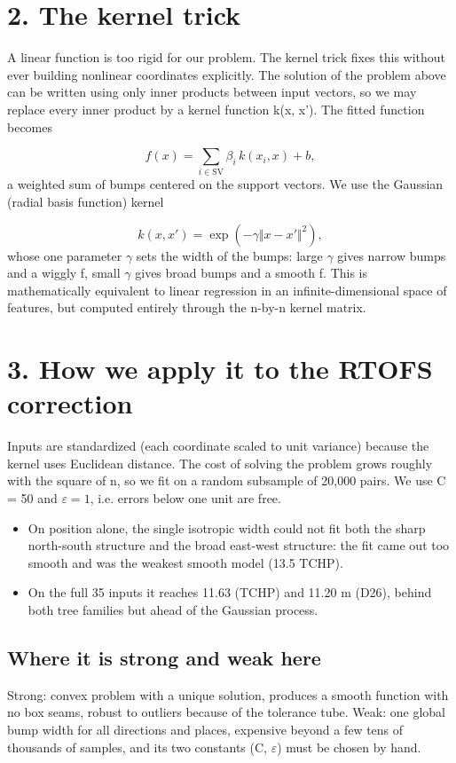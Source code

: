 \documentclass[11pt]{article}
\begin{document}
\section*{2. The kernel trick}
A linear function is too rigid for our problem. The kernel trick fixes this without ever building nonlinear coordinates explicitly. The solution of the problem above can be written using only inner products between input vectors, so we may replace every inner product by a kernel function k(x, x'). The fitted function becomes

\[ f(x) = \sum_{i \in \mathrm{SV}} \beta_i\, k(x_i, x) + b, \]
a weighted sum of bumps centered on the support vectors. We use the Gaussian (radial basis function) kernel

\[ k(x,x') = \exp(-\gamma\Vert x-x'\Vert^2), \]
whose one parameter $\gamma$ sets the width of the bumps: large $\gamma$ gives narrow bumps and a wiggly f, small $\gamma$ gives broad bumps and a smooth f. This is mathematically equivalent to linear regression in an infinite-dimensional space of features, but computed entirely through the n-by-n kernel matrix.

\section*{3. How we apply it to the RTOFS correction}
Inputs are standardized (each coordinate scaled to unit variance) because the kernel uses Euclidean distance. The cost of solving the problem grows roughly with the square of n, so we fit on a random subsample of 20,000 pairs. We use C = 50 and $\varepsilon = 1$, i.e. errors below one unit are free.

\begin{itemize}
\item On position alone, the single isotropic width could not fit both the sharp north-south structure and the broad east-west structure: the fit came out too smooth and was the weakest smooth model (13.5 TCHP).
\item On the full 35 inputs it reaches 11.63 (TCHP) and 11.20 m (D26), behind both tree families but ahead of the Gaussian process.
\end{itemize}
\subsection*{Where it is strong and weak here}
Strong: convex problem with a unique solution, produces a smooth function with no box seams, robust to outliers because of the tolerance tube. Weak: one global bump width for all directions and places, expensive beyond a few tens of thousands of samples, and its two constants (C, $\varepsilon$) must be chosen by hand.
\end{document}
